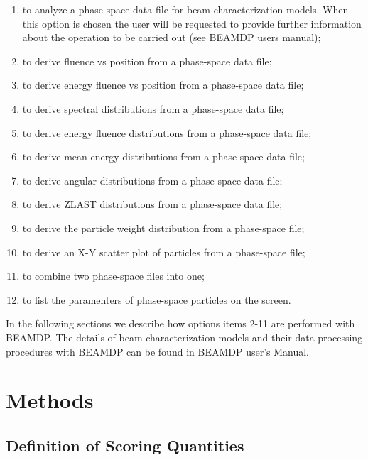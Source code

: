 \documentclass[12pt,twoside]{article}
\begin{document}
\begin{enumerate}
\item to analyze a phase-space data file for beam characterization models.
When this option is chosen the user will be requested to provide further
information about the operation to be carried out (see BEAMDP users
manual);

\item to derive fluence vs position from a phase-space data file;

\item to derive energy fluence vs position from a phase-space data file;

\item to derive spectral distributions from a phase-space data file;

\item to derive energy fluence distributions from a phase-space data file;

\item to derive mean energy distributions from a phase-space data file;

\item to derive angular distributions from a phase-space data file;

\item to derive ZLAST distributions from a phase-space data file;

\item to derive the particle weight distribution from a phase-space file;

\item to derive an X-Y scatter plot of particles from a phase-space file;

\item to combine two phase-space files into one;

\item to list the paramenters of phase-space particles on the screen.
\end{enumerate}

\noindent
In the following sections we describe how options items 2-11 are
performed with BEAMDP. The details of beam characterization models and
their data processing procedures with BEAMDP can be found in BEAMDP user's
Manual.

\section{Methods}

\subsection{Definition of Scoring Quantities}
\end{document}
